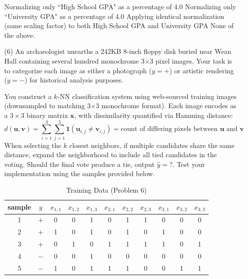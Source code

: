\documentclass[11pt,addpoints,answers]{exam}
\newcommand{\xv}{\mathbf{x}}
\newcommand{\vv}{\mathbf{v}}
\newcommand{\uv}{\mathbf{u}}
\newcounter{subq}        %
\renewcommand{\thesubq}{(\alph{subq})}  %
\newenvironment{subquestions}{
	\setcounter{subq}{0}%
	\begin{enumerate}[
		label=\thesubq,
		leftmargin=*,
		align=left,
		itemsep=6pt
		]
	}{
	\end{enumerate}
}
\begin{document}
\begin{enumerate}[label=\alph*), itemsep=10pt]
\begin{subquestions}
			\begin{checkboxes}
				\choice Normalizing only ``High School GPA" as a percentage of 4.0
				\choice Normalizing only ``University GPA" as a percentage of 4.0
				\choice Applying identical normalization (same scaling factor) to both High School GPA and University GPA
				\choice None of the above.
			\end{checkboxes}
		\end{subquestions}
		
		\clearpage
		
		\item[(6)] An archaeologist unearths a 242KB 8-inch floppy disk buried near Wean Hall containing several hundred monochrome 3×3 pixel images. Your task is to categorize each image as either a photograph ($y=+$) or artistic rendering ($y=-$) for historical analysis purposes. 
		
		You construct a $k$-NN classification system using web-sourced training images (downsampled to matching 3×3 monochrome format). Each image encodes as a $3 \times 3$ binary matrix $\xv$, with dissimilarity quantified via Hamming distance: 
		$$d(\uv, \mathbf{v}) = \sum_{i=1}^3 \sum_{j=1}^3 \mathbf{1}(\uv_{i,j} \neq \vv_{i,j}) = \text{count of differing pixels between } \uv \text{ and } \vv$$
		When selecting the $k$ closest neighbors, if multiple candidates share the same distance, expand the neighborhood to include all tied candidates in the voting. Should the final vote produce a tie, output $\hat{y}=?$. 
		Test your implementation using the samples provided below.
		
		\begin{table}[H]
			\centering
			\begin{tabular}{ccccccccccc}
				\toprule
				sample & $y$ & $x_{1,1}$ & $x_{1,2}$ & $x_{1,3}$ & $x_{2,1}$ & $x_{2,2}$ & $x_{2,3}$ & $x_{3,1}$ & $x_{3,2}$ & $x_{3,3}$  \\
				\midrule
				1 & $+$ & 0 & 0 & 1 & 0 & 1 & 1 & 0 & 0 & 0 \\
				2 & $+$ & 1 & 0 & 1 & 0 & 1 & 0 & 1 & 0 & 0 \\
				3 & $+$ & 0 & 1 & 0 & 1 & 1 & 1 & 1 & 0 & 1 \\
				4 & $-$ & 0 & 0 & 1 & 0 & 0 & 0 & 0 & 0 & 0 \\
				5 & $-$ & 1 & 0 & 1 & 1 & 1 & 0 & 0 & 1 & 1 \\
				\bottomrule
			\end{tabular}
			\caption{Training Data (Problem 6)} \label{tab:knn6_train_img}  %
		\end{table}
		

\end{enumerate}
\end{document}

